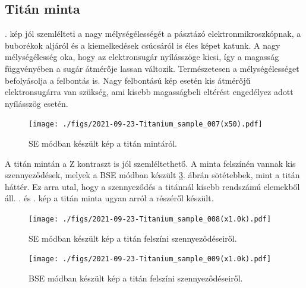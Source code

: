 \documentclass[pdftex,12pt,a4paper]{article}
\begin{document}
	\subsection{Titán minta}
		. kép jól szemlélteti a nagy mélységélességét a pásztázó elektronmikroszkópnak, a buborékok aljáról és a kiemelkedések csúcsáról is éles képet katunk. A nagy mélységélesség oka, hogy az elektronsugár nyílásszöge kicsi, így a magasság függvényében a sugár átmérője lassan változik. Természetesen a mélységélességet befolyásolja a felbontás is. Nagy felbontású kép esetén kis átmérőjű elektronsugárra van szükség, ami kisebb magasságbeli eltérést engedélyez adott nyílásszög esetén.
		\begin{figure}[H]
			\centering
			\texttt{[image: ./figs/2021-09-23-Titanium\_sample\_007(x50).pdf]}
			\caption{SE módban készült kép a titán mintáról.}
			\label{Tiholes}
		\end{figure}
		A titán mintán a Z kontraszt is jól szemléltethető. A minta felszínén vannak kis szennyeződések, melyek a BSE módban készült \ref{tibse}. ábrán sötétebbek, mint a titán háttér. Ez arra utal, hogy a szennyeződés a titánnál kisebb rendszámú elemekből áll. . és . kép a titán minta ugyan arról a részéről készült.
		\begin{figure}[H]
			\centering
			\texttt{[image: ./figs/2021-09-23-Titanium\_sample\_008(x1.0k).pdf]}
			\caption{SE módban készült kép a titán felszíni szennyeződéseiről.}
			\label{tise}
		\end{figure}
		\begin{figure}[H]
			\centering
			\texttt{[image: ./figs/2021-09-23-Titanium\_sample\_009(x1.0k).pdf]}
			\caption{BSE módban készült kép a titán felszíni szennyeződéseiről.}
			\label{tibse}
		\end{figure}
\end{document}
